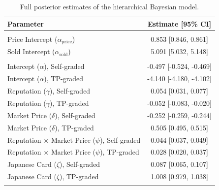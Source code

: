 \documentclass[11pt,letterpaper]{article}
\theoremstyle{definition}
\begin{document}
\begin{table}[H]
\centering
\caption{Full posterior estimates of the hierarchical Bayesian model.}\label{tab:coef}
\fontsize{7}{8.4}\selectfont
\begin{tabular}[t]{lc}
\toprule
\fontsize{8}{9.6}\selectfont Parameter & Estimate [95\% CI]\\
\midrule
\addlinespace[0.3em]
\multicolumn{2}{l}{\fontsize{8}{9.6}\selectfont \textbf{Intercepts}}\\
\hspace{1em}Price Intercept ($\alpha_{\text{price}}$) & 0.853 [0.846, 0.861]\\
\hspace{1em}Sold Intercept ($\alpha_{\text{sold}}$) & 5.091 [5.032, 5.148]\\
\addlinespace[0.3em]
\multicolumn{2}{l}{\fontsize{8}{9.6}\selectfont \textbf{Signal Selection}}\\
\hspace{1em}Intercept ($\alpha$), Self-graded & -0.497 [-0.524, -0.469]\\
\hspace{1em}Intercept ($\alpha$), TP-graded & -4.140 [-4.180, -4.102]\\
\hspace{1em}Reputation ($\gamma$), Self-graded & 0.054 [0.031, 0.077]\\
\hspace{1em}Reputation ($\gamma$), TP-graded & -0.052 [-0.083, -0.020]\\
\hspace{1em}Market Price ($\delta$), Self-graded & -0.252 [-0.259, -0.244]\\
\hspace{1em}Market Price ($\delta$), TP-graded & 0.505 [0.495, 0.515]\\
\hspace{1em}Reputation $\times$ Market Price ($\psi$), Self-graded & 0.044 [0.037, 0.049]\\
\hspace{1em}Reputation $\times$ Market Price ($\psi$), TP-graded & 0.028 [0.020, 0.037]\\
\hspace{1em}Japanese Card ($\zeta$), Self-graded & 0.087 [0.065, 0.107]\\
\hspace{1em}Japanese Card ($\zeta$), TP-graded & 1.008 [0.979, 1.038]\\
\addlinespace[0.3em]
\multicolumn{2}{l}{\fontsize{8}{9.6}\selectfont \textbf{Price Equation}}\\

\end{tabular}
\end{table}
\end{document}

